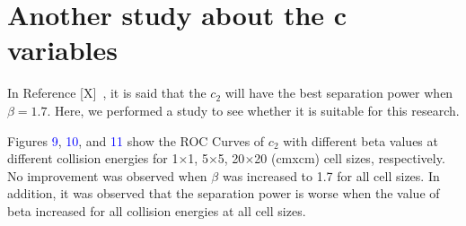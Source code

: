 \section*{Another study about the c variables}


In Reference [X]~\cite{Larkoski:2013eya}, it is said that the $c_2$ will have the best separation power when $\beta = 1.7$. Here, we performed a study to see whether it is suitable for this research.

Figures \textcolor{blue}{9}, \textcolor{blue}{10}, and \textcolor{blue}{11} show the ROC Curves of $c_2$ with different beta values at different collision energies for 1$\times$1, 5$\times$5, 20$\times$20 (cmxcm) cell sizes, respectively. No improvement was observed when $\beta$ was increased to 1.7 for all cell sizes. In addition, it was observed that the separation power is worse when the value of beta increased for all collision energies at all cell sizes.
\label{sec:c_variables_study}

